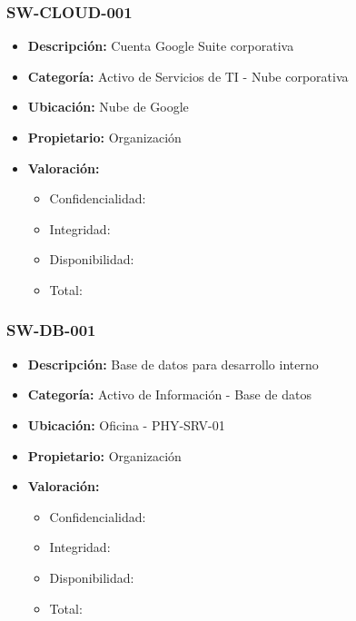 \documentclass[11pt]{utalcaDoc}
\begin{document}
\subsubsection{SW-CLOUD-001}
\begin{itemize}
    \item {\textbf{Descripción:}   Cuenta Google Suite corporativa }
    \item {\textbf{Categoría:}     Activo de Servicios de TI - Nube corporativa}
    \item {\textbf{Ubicación:}     Nube de Google }
    \item {\textbf{Propietario:}   Organización } %
    \item {\textbf{Valoración:}
          \begin{itemize}
              \item Confidencialidad:
              \item Integridad:
              \item Disponibilidad:
              \item Total:
          \end{itemize}
          }
\end{itemize}

\subsubsection{SW-DB-001}
\begin{itemize}
    \item {\textbf{Descripción:}   Base de datos para desarrollo interno }
    \item {\textbf{Categoría:}     Activo de Información - Base de datos}
    \item {\textbf{Ubicación:}     Oficina - PHY-SRV-01 }
    \item {\textbf{Propietario:}   Organización } %
    \item {\textbf{Valoración:}
          \begin{itemize}
              \item Confidencialidad:
              \item Integridad:
              \item Disponibilidad:
              \item Total:
          \end{itemize}
          }
\end{itemize}
\end{document}
